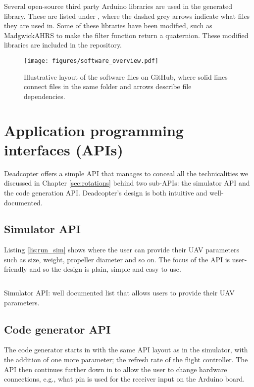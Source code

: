 Several open-source third party Arduino libraries are used in the generated library. These are listed under , where the dashed grey arrows indicate what files they are used in. Some of these libraries have been modified, such as MadgwickAHRS to make the filter function return a quaternion. These modified libraries are included in the repository.
\begin{figure}[htpb!]
    \centering
    \texttt{[image: figures/software\_overview.pdf]}
    \caption{Illustrative layout of the software files on GitHub, where solid lines connect files in the same folder and arrows describe file dependencies.}
    \label{fig:software_overview}
\end{figure}








\section{Application programming interfaces (APIs)}
Deadcopter offers a simple \ac{API} that manages to conceal all the technicalities we discussed in Chapter \ref{sec:rotations} behind two sub-APIs: the simulator API and the code generation API. Deadcopter's design is both intuitive and well-documented.



\subsection{Simulator API}
Listing \ref{lis:run_sim} shows where the user can provide their \ac{UAV} parameters such as size, weight, propeller diameter and so on. The focus of the \ac{API} is user-friendly and so the design is plain, simple and  easy to use.
\begin{listing}[htpb!]
\inputminted[frame=lines,
framesep=2mm,
baselinestretch=1.2,
bgcolor=White,
fontsize=\scriptsize,
linenos]{python}{listings/run_sim.tex}
\caption{Simulator \ac{API}: well documented list that allows users to provide their \ac{UAV} parameters.}
\label{lis:run_sim}
\end{listing}
    








\subsection{Code generator API}
The code generator starts in  with the same \ac{API} layout as in the simulator, with the addition of one more parameter; the refresh rate of the flight controller. The \ac{API} then continues further down in  to allow the user to change hardware connections, e.g., what pin is used for the receiver input on the Arduino board.







